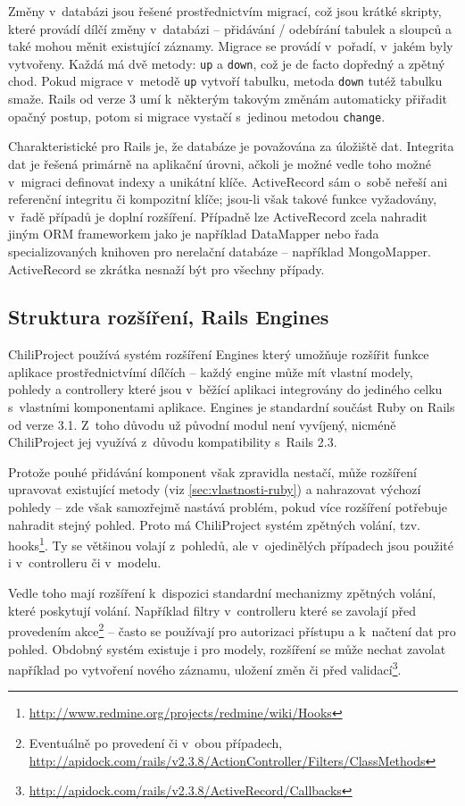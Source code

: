 \documentclass[thesis=B,czech]{FITthesis}[2012/05/02]
\begin{document}
Změny v~databázi jsou řešené prostřednictvím migrací, což jsou krátké
skripty, které provádí dílčí změny v~databázi -- přidávání / odebírání
tabulek a sloupců a také mohou měnit existující záznamy. Migrace se
provádí v~pořadí, v~jakém byly vytvořeny. Každá má dvě metody:
\lstinline!up! a \lstinline!down!, což je de facto dopředný a zpětný
chod. Pokud migrace v~metodě \lstinline!up! vytvoří tabulku, metoda
\lstinline!down! tutéž tabulku smaže. Rails od verze 3 umí k~některým
takovým změnám automaticky přiřadit opačný postup, potom si migrace
vystačí s~jedinou metodou \lstinline!change!.

Charakteristické pro Rails je, že databáze je považována za 
úložiště dat. Integrita dat je řešená primárně na aplikační úrovni,
ačkoli je možné vedle toho možné v~migraci definovat indexy a unikátní
klíče. ActiveRecord sám o~sobě neřeší ani referenční integritu či
kompozitní klíče; jsou-li však takové funkce vyžadovány, v~řadě případů
je doplní rozšíření. Případně lze ActiveRecord zcela nahradit jiným ORM
frameworkem jako je například DataMapper nebo řada specializovaných
knihoven pro nerelační databáze -- například MongoMapper. ActiveRecord
se zkrátka nesnaží být  pro všechny případy.

\subsection{Struktura rozšíření, Rails Engines}

ChiliProject používá systém rozšíření Engines který umožňuje rozšířit
funkce aplikace prostřednictvímí dílčích  -- každý
engine může mít vlastní modely, pohledy a controllery které jsou
v~běžící aplikaci integrovány do jediného celku s~vlastními komponentami
aplikace. Engines je standardní součást Ruby on Rails od verze 3.1.
Z~toho důvodu už původní modul není vyvíjený, nicméně ChiliProject jej
využívá z~důvodu kompatibility s~Rails 2.3.

Protože pouhé přidávání komponent však zpravidla nestačí, může rozšíření
upravovat existující metody (viz
\ref{sec:vlastnosti-ruby}) a
nahrazovat výchozí pohledy -- zde však samozřejmě nastává problém, pokud
více rozšíření potřebuje nahradit stejný pohled. Proto má ChiliProject
systém zpětných volání, tzv. hooks\footnote{\url{http://www.redmine.org/projects/redmine/wiki/Hooks}}.
Ty se většinou volají z~pohledů, ale v~ojedinělých případech jsou
použité i v~controlleru či v~modelu.

Vedle toho mají rozšíření k~dispozici standardní mechanizmy zpětných
volání, které poskytují volání. Například filtry v~controlleru které se
zavolají před provedením akce\footnote{Eventuálně po provedení či v~obou
  případech,
  \url{http://apidock.com/rails/v2.3.8/ActionController/Filters/ClassMethods}}
-- často se používají pro autorizaci přístupu a k~načtení dat pro
pohled. Obdobný systém existuje i pro modely, rozšíření se může nechat
zavolat například po vytvoření nového záznamu, uložení změn či před
validací\footnote{\url{http://apidock.com/rails/v2.3.8/ActiveRecord/Callbacks}}.
\end{document}
